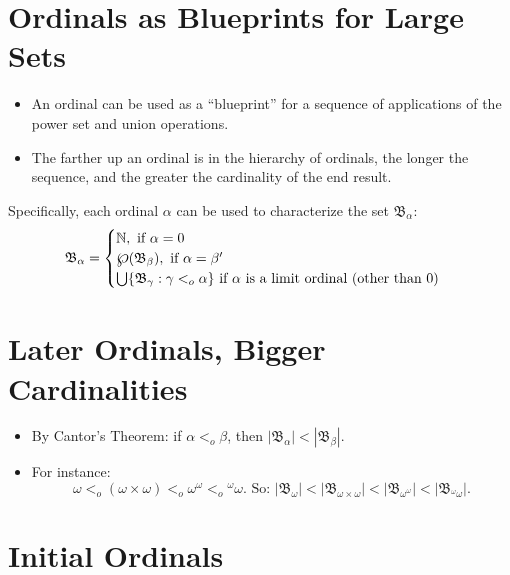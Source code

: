 \documentclass[12pt]{extarticle}
\begin{document}


\section{Ordinals as Blueprints for Large Sets}


\begin{itemize}
\item An ordinal can be used as a ``blueprint'' for a sequence of applications of the power set and union operations. 

\item The farther up an ordinal is in the hierarchy of ordinals, the longer the sequence, and the greater the cardinality of the end result.


\end{itemize}
Specifically, each ordinal $\alpha$ can be used to characterize the set $\mathfrak{B}_\alpha$:
\[
\mathfrak{B}_\alpha=
\begin{cases}
\mathbb{N}, \text{ if $\alpha = 0$}\\
\powerset(\mathfrak{B}_\beta), \text{ if $\alpha = \beta'$}\\
\bigcup \{\mathfrak{B}_\gamma : \gamma <_o \alpha\} \text{ if $\alpha$ is a limit ordinal (other than 0)}
\end{cases}
\]

\section{Later Ordinals, Bigger Cardinalities}

\begin{itemize}
\item By Cantor's Theorem: if $\alpha <_o \beta$, then $|\mathfrak{B}_\alpha| < |\mathfrak{B}_\beta|$.

\item For instance: 
$$\omega <_o (\omega \times \omega) <_o \omega^\omega <_o {^\omega\omega} \text{. So: } |\mathfrak{B}_{\omega}| < |\mathfrak{B}_{\omega \times \omega}| < |\mathfrak{B}_{\omega^\omega}| < |\mathfrak{B}_{^\omega\omega}|.$$

\end{itemize}


\section{Initial Ordinals}
\end{document}

